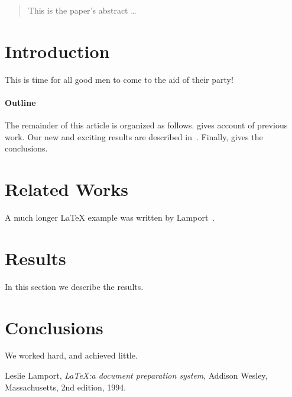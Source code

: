 \documentclass[12pt]{article}
\begin{document}
\maketitle

\begin{abstract}
This is the paper's abstract \ldots
\end{abstract}

\section{Introduction}
\label{sec:introduction}
This is time for all good men to come to the aid of their party!

\paragraph{Outline}
\label{par:outline}
The remainder of this article is organized as follows.
 gives account of previous work.
Our new and exciting results are described in~.
Finally,  gives the conclusions.

\section{Related Works}
\label{sec:related_works}
A much longer \LaTeX{} example was written by Lamport~\cite{lamport94}.

\section{Results}
\label{sec:results}
In this section we describe the results.

\section{Conclusions}
\label{sec:conclusions}
We worked hard, and achieved little.

\begin{thebibliography}{9}

    Leslie Lamport,
    \emph{\LaTeX:\@ a document preparation system},
    Addison Wesley, Massachusetts,
    2nd edition,
    1994.

\end{thebibliography}

% 
% 
\end{document}
